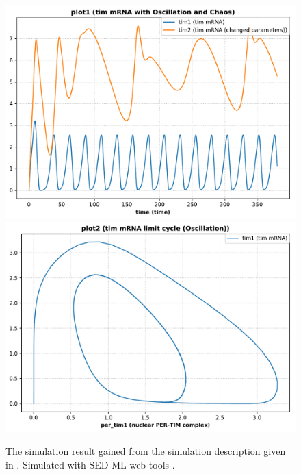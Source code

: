 \begin{figure}[ht]
\begin{minipage}{0.47\textwidth}
        \caption{The simulation result gained from the simulation description given in . Simulated with SED-ML web tools \citep{bergmann2017sed}.}
    \end{minipage}\hfill
    \begin{minipage}{0.47\textwidth}
        \centering
         \includegraphics[width=1.0\textwidth]{examples/leloup-sbml/results/tellurium/plot1}
		\includegraphics[width=1.0\textwidth]{examples/leloup-sbml/results/tellurium/plot2}

\end{minipage}
\end{figure}
